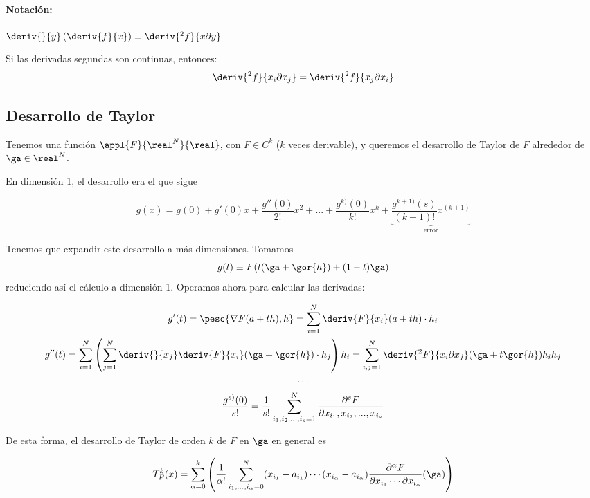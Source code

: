 \paragraph{Notación:}

$\deriv{}{y}\left(\deriv{f}{x}\right) \equiv \deriv{^2f}{x \partial y}$

\begin{theorem}
Si las derivadas segundas son continuas, entonces:
$$\deriv{^2f}{x_i\partial x_j} = \deriv{^2 f}{x_j \partial x_i}$$
\end{theorem}



\subsection{Desarrollo de Taylor}
Tenemos una función $\appl{F}{\real^N}{\real}$, con $F\in C^k$ ($k$ veces derivable), y queremos el desarrollo de Taylor de $F$ alrededor de $\ga \in \real^N$.

En dimensión 1, el desarrollo era el que sigue

\[ g(x) = g(0) + g'(0)x + \frac{g''(0)}{2!}x^2 + ... + \frac{g^{k)}(0)}{k!}x^k + \underbrace{\frac{g^{k+1)}(s)}{(k+1)!}x^{(k+1)}}_{\text{error}} \]

Tenemos que expandir este desarrollo a más dimensiones. Tomamos \[ g(t) \equiv F(t(\ga + \gor{h}) + (1-t)\ga) \] reduciendo así el cálculo a dimensión 1. Operamos ahora para calcular las derivadas:

\begin{gather*}
g'(t) = \pesc{\nabla F(a+th),h} = \sum_{i=1}^N \deriv{F}{x_i}(a+th)\cdot h_i \\
g''(t) = \sum_{i=1}^N\left(\sum_{j=1}^N \deriv{}{x_j}\deriv{F}{x_i}(\ga+\gor{h})\cdot{h_j}\right)h_i = \sum_{i,j = 1}^N \deriv{^2F}{x_i \partial x_j}(\ga+t\gor{h})h_ih_j \\
\dotsb \\
\frac{g^{s)} (0)}{s!} = \frac{1}{s!}\sum_{i_1,i_2,...,i_s=1}^N \frac{\partial^s F}{\partial x_{i_1},x_{i_2},...,x_{i_s}}
\end{gather*}

De esta forma, el desarrollo de Taylor de orden $k$ de $F$ en $\ga$ en general es

\begin{equation}
T^k_F(x) = \sum_{\alpha = 0}^k 
	\left( 
		\frac{1}{\alpha !}
		\sum_{i_1,\dotsc,i_\alpha = 0}^N 
			(x_{i_1} - a_{i_1}) \dotsb (x_{i_\alpha} - a_{i_\alpha}) 
			\frac{\partial^\alpha F}{\partial x_{i_1} \dotsb \partial x_{i_\alpha}} 
			 (\ga)
	\right) 
\end{equation}

